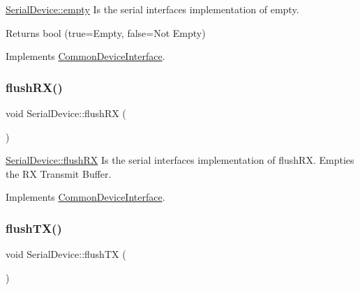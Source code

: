 \hyperlink{class_serial_device_ae9fc540188704dbdbf3e75d482a92b86}{Serial\+Device\+::empty} Is the serial interface\textquotesingle{}s implementation of empty. 

\begin{DoxyReturn}{Returns}
bool (true=Empty, false=Not Empty) 
\end{DoxyReturn}


Implements \hyperlink{class_common_device_interface_ad670a54efd57ef65a659623f2a0b76e9}{Common\+Device\+Interface}.

\hypertarget{class_serial_device_a9ba3e46cf67a9b03e1614afe4c40d78a}{}\label{class_serial_device_a9ba3e46cf67a9b03e1614afe4c40d78a} 
\subsubsection{\texorpdfstring{flush\+R\+X()}{flushRX()}}
{\footnotesize\ttfamily void Serial\+Device\+::flush\+RX (\begin{DoxyParamCaption}{ }\end{DoxyParamCaption})\hspace{0.3cm}{\ttfamily [virtual]}}



\hyperlink{class_serial_device_a9ba3e46cf67a9b03e1614afe4c40d78a}{Serial\+Device\+::flush\+RX} Is the serial interface\textquotesingle{}s implementation of flush\+RX. Empties the RX Transmit Buffer. 



Implements \hyperlink{class_common_device_interface_a353c3bd7d63dfa9c3fa3d8bf1f392530}{Common\+Device\+Interface}.

\hypertarget{class_serial_device_a56d7c575161fd216821d06e25f37106c}{}\label{class_serial_device_a56d7c575161fd216821d06e25f37106c} 
\subsubsection{\texorpdfstring{flush\+T\+X()}{flushTX()}}
{\footnotesize\ttfamily void Serial\+Device\+::flush\+TX (\begin{DoxyParamCaption}{ }\end{DoxyParamCaption})\hspace{0.3cm}{\ttfamily [virtual]}}




